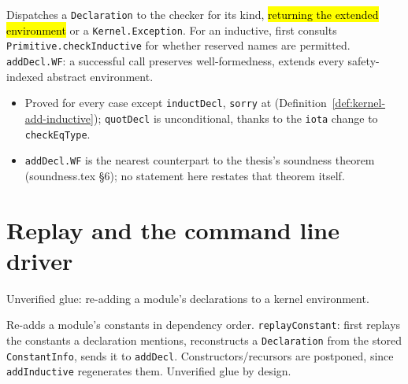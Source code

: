 \begin{definition}
\label{def:kernel-add-decl}
\leanok
{}

 Dispatches a \texttt{Declaration} to the checker for its kind, \hl{returning the
extended environment} or a \texttt{Kernel.Exception}. For an inductive, first consults
\texttt{Primitive.checkInductive} for whether reserved names are permitted.
\texttt{addDecl.WF}: a successful call preserves well-formedness, extends every safety-indexed
abstract environment.
\begin{itemize}
\item {} Proved for every case except \texttt{inductDecl}, \texttt{sorry} at
 (Definition~\ref{def:kernel-add-inductive});
\texttt{quotDecl} is unconditional, thanks to the \texttt{iota} change to \texttt{checkEqType}.
\item {} \texttt{addDecl.WF} is the nearest counterpart to the thesis's soundness
theorem (soundness.tex \S6); no statement here restates that theorem itself.
\end{itemize}
\end{definition}

\section{Replay and the command line driver}

Unverified glue: re-adding a module's declarations to a kernel environment.

\begin{definition}
\label{family:kernel-replay-core}
\leanok
{}
 Re-adds a module's constants in dependency order. \texttt{replayConstant}: first
replays the constants a declaration mentions, reconstructs a \texttt{Declaration} from the stored
\texttt{ConstantInfo}, sends it to \texttt{addDecl}. Constructors/recursors are postponed, since
\texttt{addInductive} regenerates them. Unverified glue by design.
\end{definition}

